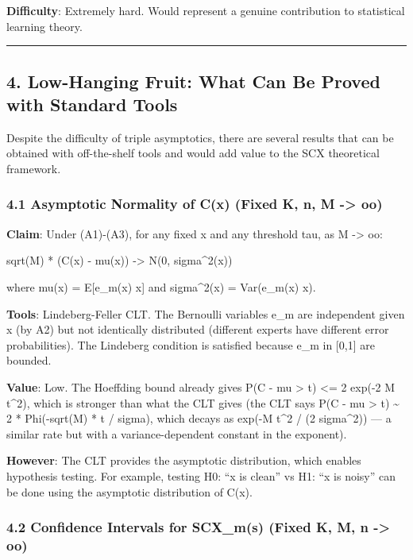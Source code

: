 \documentclass[
  12pt,
]{ctexart}
\begin{document}
\textbf{Difficulty}: Extremely hard. Would represent a genuine
contribution to statistical learning theory.

\begin{center}\rule{0.5\linewidth}{0.5pt}\end{center}

\subsection{4. Low-Hanging Fruit: What Can Be Proved with Standard
Tools}\label{low-hanging-fruit-what-can-be-proved-with-standard-tools}

Despite the difficulty of triple asymptotics, there are several results
that can be obtained with off-the-shelf tools and would add value to the
SCX theoretical framework.

\subsubsection{4.1 Asymptotic Normality of C(x) (Fixed K, n, M
-\textgreater{} oo)}\label{asymptotic-normality-of-cx-fixed-k-n-m---oo}

\textbf{Claim}: Under (A1)-(A3), for any fixed x and any threshold tau,
as M -\textgreater{} oo:

sqrt(M) * (C(x) - mu(x)) -\textgreater{} N(0, sigma\^{}2(x))

where mu(x) = E{[}e\_m(x) \textbar{} x{]} and sigma\^{}2(x) =
Var(e\_m(x) \textbar{} x).

\textbf{Tools}: Lindeberg-Feller CLT. The Bernoulli variables e\_m are
independent given x (by A2) but not identically distributed (different
experts have different error probabilities). The Lindeberg condition is
satisfied because e\_m in {[}0,1{]} are bounded.

\textbf{Value}: Low. The Hoeffding bound already gives P(\textbar C -
mu\textbar{} \textgreater{} t) \textless= 2 exp(-2 M t\^{}2), which is
stronger than what the CLT gives (the CLT says P(\textbar C -
mu\textbar{} \textgreater{} t) \textasciitilde{} 2 * Phi(-sqrt(M) * t /
sigma), which decays as exp(-M t\^{}2 / (2 sigma\^{}2)) --- a similar
rate but with a variance-dependent constant in the exponent).

\textbf{However}: The CLT provides the asymptotic distribution, which
enables hypothesis testing. For example, testing H0: ``x is clean'' vs
H1: ``x is noisy'' can be done using the asymptotic distribution of
C(x).

\subsubsection{4.2 Confidence Intervals for SCX\_m(s) (Fixed K, M, n
-\textgreater{}
oo)}\label{confidence-intervals-for-scx_ms-fixed-k-m-n---oo}
\end{document}
